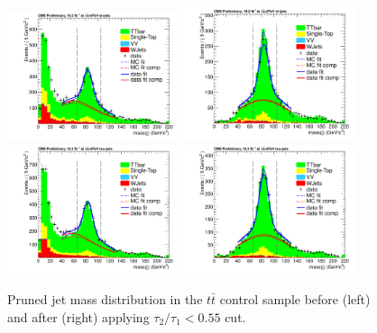 \begin{figure}[htbp]
\centering
\includegraphics[width=0.45\textwidth]{figs/topwjes/control_medium_el_without_tau2tau1.pdf}
\includegraphics[width=0.45\textwidth]{figs/topwjes/control_medium_el_with_tau2tau1.pdf}\\
\includegraphics[width=0.45\textwidth]{figs/topwjes/control_medium_mu_without_tau2tau1.pdf}
\includegraphics[width=0.45\textwidth]{figs/topwjes/control_medium_mu_with_tau2tau1.pdf}\\
\caption{Pruned jet mass distribution in the $t\bar{t}$ control sample before (left) and after (right) applying $\tau_2/\tau_1<0.55$ cut.}
\label{fig:ttbarControl_nocut}
\end{figure}

